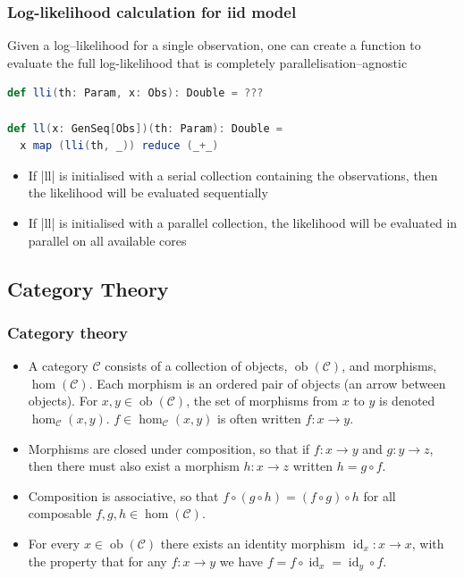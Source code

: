 \documentclass[mathserif,handout]{beamer}
\begin{document}
\begin{frame}[fragile]
  \frametitle{Log-likelihood calculation for iid model}
Given a log--likelihood for a single observation, one can create a function to evaluate the full log-likelihood that is completely \alert{parallelisation--agnostic}
\begin{lstlisting}[language=scala]
def lli(th: Param, x: Obs): Double = ???

def ll(x: GenSeq[Obs])(th: Param): Double =
  x map (lli(th, _)) reduce (_+_)
\end{lstlisting}
\begin{itemize}
\item If |ll| is initialised with a serial collection containing the observations, then the likelihood will be evaluated sequentially
\item If |ll| is initialised with a parallel collection, the likelihood will be evaluated in parallel on all available cores
\end{itemize}
\end{frame}


\subsection{Category Theory}

\begin{frame}[fragile]
  \frametitle{Category theory}
  \begin{itemize}
  \item A category $\mathcal{C}$ consists of a collection of \alert{objects}, $\operatorname{ob}(\mathcal{C})$, and \alert{morphisms}, $\operatorname{hom}(\mathcal{C})$. Each morphism is an ordered pair of objects (an arrow between objects). For $x,y\in \operatorname{ob}(\mathcal{C})$, the set of morphisms from $x$ to $y$ is denoted $\operatorname{hom}_{\mathcal{C}}(x,y)$. $f\in \operatorname{hom}_{\mathcal{C}}(x,y)$ is often written $f: x \longrightarrow y$.
  \item Morphisms are closed under \alert{composition}, so that if $f: x\longrightarrow y$ and $g: y\longrightarrow z$, then there must also exist a morphism $h: x\longrightarrow z$ written $h=g \circ f$.
  \item Composition is associative, so that $f\circ(g\circ h) = (f\circ g)\circ h$ for all composable $f, g, h\in \operatorname{hom}(\mathcal{C})$.
    \item For every $x\in \operatorname{ob}(\mathcal{C})$ there exists an \alert{identity} morphism $\operatorname{id}_x: x\longrightarrow x$, with the property that for any $f: x\longrightarrow y$ we have $f = f\circ \operatorname{id}_x = \operatorname{id}_y\circ f$.
  \end{itemize}
\end{frame}
\end{document}
